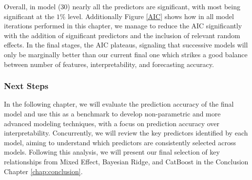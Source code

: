 Overall, in model (30) nearly all the predictors are significant, with most being significant at the $1\%$ level. Additionally Figure \ref{AIC} shows how in all model iterations performed in this chapter, we manage to reduce the AIC significantly with the addition of significant predictors and the inclusion of relevant random effects. In the final stages, the AIC plateaus, signaling that successive models will only be marginally better than our current final one which strikes a good balance between number of features, interpretability, and forecasting accuracy.

\subsubsection{Next Steps}
In the following chapter, we will evaluate the prediction accuracy of the final model and use this as a benchmark to develop non-parametric and more advanced modeling techniques, with a focus on prediction accuracy over interpretability. Concurrently, we will review the key predictors identified by each model, aiming to understand which predictors are consistently selected across models. Following this analysis, we will present our final selection of key relationships from Mixed Effect, Bayesian Ridge, and CatBoost in the Conclusion Chapter \ref{chap:conclusion}.